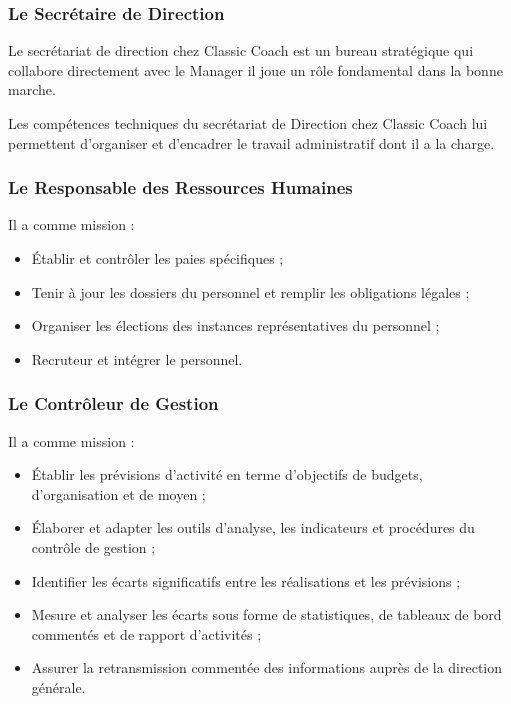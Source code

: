             \subsubsection[Le Secrétaire de Direction]{Le Secrétaire de Direction}
            Le secrétariat de direction chez Classic Coach est un bureau stratégique
            qui collabore directement avec le Manager il joue un rôle fondamental dans
            la bonne marche.
            \par\noindent
            Les compétences techniques du secrétariat de Direction chez Classic Coach
            lui permettent d’organiser et d’encadrer le travail administratif dont il a la charge.

            \subsubsection[Le Responsable des Ressources Humaines]{Le Responsable des Ressources Humaines}
            Il a comme mission :
            \par
                \begin{itemize}
                    \setlength{\itemsep}{0pt}
                    \item [\ding{226}] Établir et contrôler les paies spécifiques ;
                    \item [\ding{226}] Tenir à jour les dossiers du personnel et remplir les obligations légales ;
                    \item [\ding{226}] Organiser les élections des instances représentatives du personnel ;
                    \item [\ding{226}] Recruteur et intégrer le personnel.
                \end{itemize}
            \subsubsection[Le Contrôleur de Gestion]{Le Contrôleur de Gestion}
            Il a comme mission :
            \par
                \begin{itemize}
                    \setlength{\itemsep}{0pt}
                    \item [\ding{226}] Établir les prévisions d’activité en terme d’objectifs de budgets,
                    d’organisation et de moyen ;
                    \item [\ding{226}] Élaborer et adapter les outils d’analyse, les indicateurs et
                    procédures du contrôle de gestion ;
                    \item [\ding{226}] Identifier les écarts significatifs entre les réalisations et les prévisions ;
                    \item [\ding{226}] Mesure et analyser les écarts sous forme de statistiques, de tableaux de bord commentés et de rapport d’activités ;
                    \item [\ding{226}] Assurer la retransmission commentée des informations auprès de la direction générale.
                \end{itemize} 
